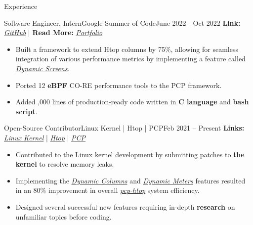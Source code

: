 \documentclass[]{Sohaib-Mohamed}
\begin{document}
\makeheader

\begin{cvsection}{Experience}

   \begin{cvsubsection}{Software Engineer, Intern}{Google Summer of Code}{June 2022 - Oct 2022}
      \textbf{Link:} \href{https://gist.github.com/smalinux/e869b376b5c77cacdcda4cb14f027632}{\textit{GitHub}} | \textbf{Read More:} \href{https://gist.github.com/smalinux/2e9c5537fdac65501a655280352c9c15#google-summer-of-code-2022}{\textit{Portfolio}}
      \begin{itemize}
         \item Built a framework to extend Htop columns by 75\%, allowing for seamless integration of various performance metrics by implementing a feature called \href{https://github.com/htop-dev/htop/pull/1102}{\textit{Dynamic Screens}}.
         \item Ported 12 \textbf{eBPF} CO-RE performance tools to the PCP framework.
         \item Added ,000 lines of production-ready code written in \textbf{C language} and \textbf{bash script}.
      \end{itemize}
   \end{cvsubsection}

   \begin{cvsubsection}{Open-Source Contributor}{Linux Kernel | Htop | PCP}{Feb 2021 -- Present}
      \textbf{Links:} \href{https://git.kernel.org/pub/scm/linux/kernel/git/next/linux-next.git/log/?qt=grep&q=sohaib}{\textit{Linux Kernel}} | \href{https://github.com/htop-dev/htop/commits?author=smalinux}{\textit{Htop}} | \href{https://github.com/performancecopilot/pcp/commits?author=smalinux}{\textit{PCP}}
      \begin{itemize}
         \item Contributed to the Linux kernel development by submitting patches to \textbf{the kernel} to resolve memory leaks.
         \item Implementing the \href{https://github.com/htop-dev/htop/pull/707}{\textit{Dynamic Columns}} and \href{https://github.com/htop-dev/htop/pull/669}{\textit{Dynamic Meters}} features resulted in an 80\% improvement in overall \href{https://man.archlinux.org/man/pcp-htop.1.en}{\textit{pcp-htop}} system efficiency.
         \item Designed several successful new features requiring in-depth \textbf{research} on unfamiliar topics before coding.
      \end{itemize}
   \end{cvsubsection}
\end{cvsection}
\end{document}
